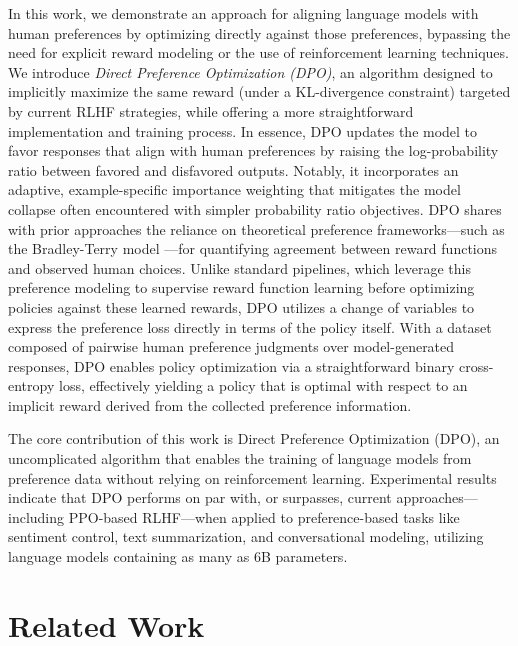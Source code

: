 In this work, we demonstrate an approach for aligning language models with human preferences by optimizing directly against those preferences, bypassing the need for explicit reward modeling or the use of reinforcement learning techniques. We introduce \textit{{Direct Preference Optimization} (DPO)}, an algorithm designed to implicitly maximize the same reward (under a KL-divergence constraint) targeted by current RLHF strategies, while offering a more straightforward implementation and training process. In essence, DPO updates the model to favor responses that align with human preferences by raising the log-probability ratio between favored and disfavored outputs. Notably, it incorporates an adaptive, example-specific importance weighting that mitigates the model collapse often encountered with simpler probability ratio objectives. DPO shares with prior approaches the reliance on theoretical preference frameworks—such as the Bradley-Terry model \cite{bradley1952rankanalysis}—for quantifying agreement between reward functions and observed human choices. Unlike standard pipelines, which leverage this preference modeling to supervise reward function learning before optimizing policies against these learned rewards, DPO utilizes a change of variables to express the preference loss directly in terms of the policy itself. With a dataset composed of pairwise human preference judgments over model-generated responses, DPO enables policy optimization via a straightforward binary cross-entropy loss, effectively yielding a policy that is optimal with respect to an implicit reward derived from the collected preference information.

The core contribution of this work is Direct Preference Optimization (DPO), an uncomplicated algorithm that enables the training of language models from preference data without relying on reinforcement learning. Experimental results indicate that DPO performs on par with, or surpasses, current approaches—including PPO-based RLHF—when applied to preference-based tasks like sentiment control, text summarization, and conversational modeling, utilizing language models containing as many as 6B parameters.

\section{Related Work}

